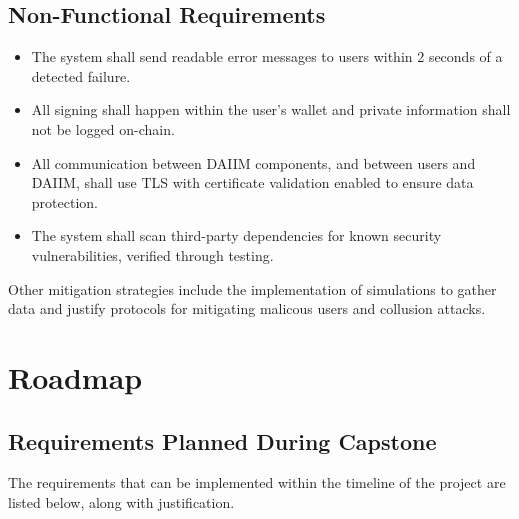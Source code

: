 \documentclass{article}
\newcommand{\saref}[1]{\ref{#1}}
\begin{document}
\subsection{Non-Functional Requirements}

\noindent \begin{itemize}

\item[\saref{SA_ErrorMessageTime}:] The system shall send readable error messages to users within 2 seconds of a detected failure.

\item[\saref{SA_WalletSigning}:] All signing shall happen within the user's wallet and private information shall not be logged on-chain.

\item[\saref{SA_TLS}:] All communication between DAIIM components, and between users and DAIIM, shall use TLS with certificate validation enabled to ensure data protection.

\item[\saref{SA_DependencyScan}:] The system shall scan third-party dependencies for known security vulnerabilities, verified through testing.

\end{itemize}


Other mitigation strategies include the implementation of simulations to gather data and justify protocols for mitigating malicous users and collusion attacks.


\section{Roadmap}



\subsection{Requirements Planned During Capstone}

The requirements that can be implemented within the timeline of the project are listed below, along with justification.
\end{document}
